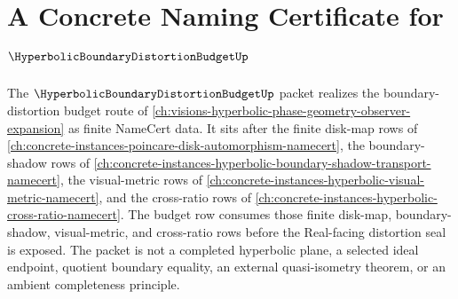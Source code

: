 \chapter{A Concrete Naming Certificate for $\HyperbolicBoundaryDistortionBudgetUp$}
\label{ch:concrete-instances-hyperbolic-boundary-distortion-budget-namecert}

The $\HyperbolicBoundaryDistortionBudgetUp$ packet realizes the boundary-distortion budget route of \autoref{ch:visions-hyperbolic-phase-geometry-observer-expansion} as finite NameCert data. It sits after the finite disk-map rows of \autoref{ch:concrete-instances-poincare-disk-automorphism-namecert}, the boundary-shadow rows of \autoref{ch:concrete-instances-hyperbolic-boundary-shadow-transport-namecert}, the visual-metric rows of \autoref{ch:concrete-instances-hyperbolic-visual-metric-namecert}, and the cross-ratio rows of \autoref{ch:concrete-instances-hyperbolic-cross-ratio-namecert}. The budget row consumes those finite disk-map, boundary-shadow, visual-metric, and cross-ratio rows before the Real-facing distortion seal is exposed. The packet is not a completed hyperbolic plane, a selected ideal endpoint, quotient boundary equality, an external quasi-isometry theorem, or an ambient completeness principle.

